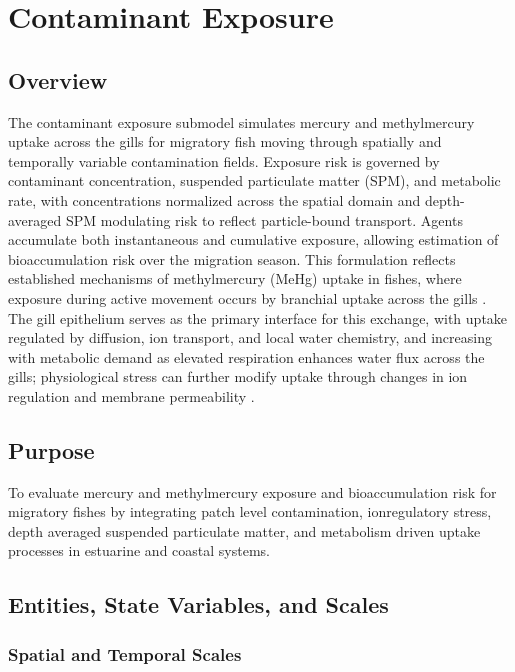 \documentclass[
]{book}
\begin{document}
\chapter{Contaminant Exposure}\label{contaminant-exposure}

\section{Overview}\label{overview-4}

The contaminant exposure submodel simulates mercury and methylmercury uptake across the gills for migratory fish moving through spatially and temporally variable contamination fields. Exposure risk is governed by contaminant concentration, suspended particulate matter (SPM), and metabolic rate, with concentrations normalized across the spatial domain and depth-averaged SPM modulating risk to reflect particle-bound transport. Agents accumulate both instantaneous and cumulative exposure, allowing estimation of bioaccumulation risk over the migration season. This formulation reflects established mechanisms of methylmercury (MeHg) uptake in fishes, where exposure during active movement occurs by branchial uptake across the gills \citep{hall_food_1997, evans_fish_1987}. The gill epithelium serves as the primary interface for this exchange, with uptake regulated by diffusion, ion transport, and local water chemistry, and increasing with metabolic demand as elevated respiration enhances water flux across the gills; physiological stress can further modify uptake through changes in ion regulation and membrane permeability \citep{trudel_bioenergetics_2006}.

\section{Purpose}\label{purpose-4}

To evaluate mercury and methylmercury exposure and bioaccumulation risk for migratory fishes by integrating patch level contamination, ionregulatory stress, depth averaged suspended particulate matter, and metabolism driven uptake processes in estuarine and coastal systems.

\section{Entities, State Variables, and Scales}\label{entities-state-variables-and-scales-4}

\subsection{Spatial and Temporal Scales}\label{spatial-and-temporal-scales-4}
\end{document}
